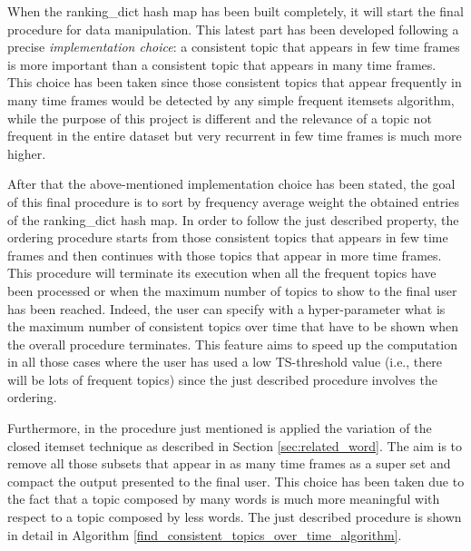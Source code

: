 When the ranking\_dict hash map has been built completely, it will start the final procedure for data manipulation. This latest part has been developed following a precise \textit{implementation choice}: a consistent topic that appears in few time frames is more important than a consistent topic that appears in many time frames. This choice has been taken since those consistent topics that appear frequently in many time frames would be detected by any simple frequent itemsets algorithm, while the purpose of this project is different and the relevance of a topic not frequent in the entire dataset but very recurrent in few time frames is much more higher.

\noindent After that the above-mentioned implementation choice has been stated, the goal of this final procedure is to sort by frequency average weight the obtained entries of the ranking\_dict hash map. In order to follow the just described property, the ordering procedure starts from those consistent topics that appears in few time frames and then continues with those topics that appear in more time frames. This procedure will terminate its execution when all the frequent topics have been processed or when the maximum number of topics to show to the final user has been reached. Indeed, the user can specify with a hyper-parameter what is the maximum number of consistent topics over time that have to be shown when the overall procedure terminates. This feature aims to speed up the computation in all those cases where the user has used a low TS-threshold value (i.e., there will be lots of frequent topics) since the just described procedure involves the ordering.

\noindent Furthermore, in the procedure just mentioned is applied the variation of the closed itemset technique as described in Section \ref{sec:related_word}. The aim is to remove all those subsets that appear in as many time frames as a super set and compact the output presented to the final user. This choice has been taken due to the fact that a topic composed by many words is much more meaningful with respect to a topic composed by less words. The just described procedure is shown in detail in Algorithm \ref{find_consistent_topics_over_time_algorithm}.

